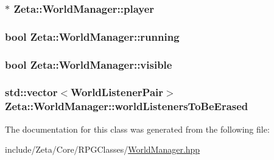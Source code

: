 \hypertarget{classZeta_1_1WorldManager_abf8ed0d3fbc48096ac16edfdce8c14f7}{
\subsubsection[{player}]{$\ast$ Zeta\+::\+World\+Manager\+::player\hspace{0.3cm}{\ttfamily [private]}}}\label{classZeta_1_1WorldManager_abf8ed0d3fbc48096ac16edfdce8c14f7}
\hypertarget{classZeta_1_1WorldManager_af613bcf59a48f527ae8ad965ac325bfc}{
\subsubsection[{running}]{\setlength{\rightskip}{0pt plus 5cm}bool Zeta\+::\+World\+Manager\+::running\hspace{0.3cm}{\ttfamily [private]}}}\label{classZeta_1_1WorldManager_af613bcf59a48f527ae8ad965ac325bfc}
\hypertarget{classZeta_1_1WorldManager_a047253e00257f247919a2d075baafc34}{
\subsubsection[{visible}]{\setlength{\rightskip}{0pt plus 5cm}bool Zeta\+::\+World\+Manager\+::visible\hspace{0.3cm}{\ttfamily [private]}}}\label{classZeta_1_1WorldManager_a047253e00257f247919a2d075baafc34}
\hypertarget{classZeta_1_1WorldManager_a9d5daaf5fd9db8f35b52e9606c6d9ede}{
\subsubsection[{world\+Listeners\+To\+Be\+Erased}]{\setlength{\rightskip}{0pt plus 5cm}std\+::vector$<${\bf World\+Listener\+Pair}$>$ Zeta\+::\+World\+Manager\+::world\+Listeners\+To\+Be\+Erased\hspace{0.3cm}{\ttfamily [private]}}}\label{classZeta_1_1WorldManager_a9d5daaf5fd9db8f35b52e9606c6d9ede}


The documentation for this class was generated from the following file\+:\begin{DoxyCompactItemize}
\item 
include/\+Zeta/\+Core/\+R\+P\+G\+Classes/\hyperlink{WorldManager_8hpp}{World\+Manager.\+hpp}\end{DoxyCompactItemize}
